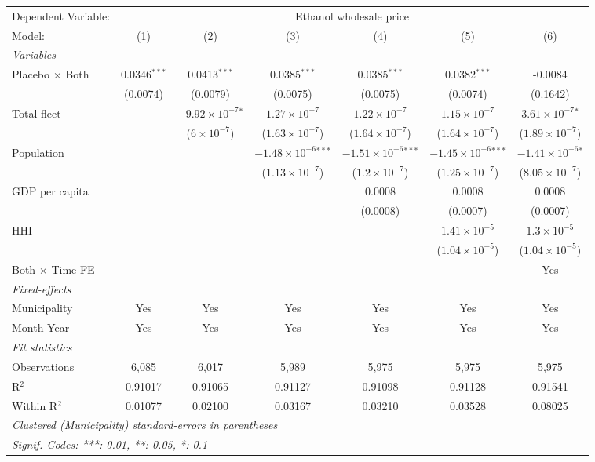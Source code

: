 \documentclass[
]{article}
\begin{document}
\begin{tabular}{lcccccc}
\tabularnewline\midrule\midrule
Dependent Variable:&\multicolumn{6}{c}{Ethanol wholesale price}\\
Model:&(1) & (2) & (3) & (4) & (5) & (6)\\
\midrule \emph{Variables}&   &   &   &   &   &  \\
Placebo $\times $ Both & 0.0346$^{***}$ & 0.0413$^{***}$ & 0.0385$^{***}$ & 0.0385$^{***}$ & 0.0382$^{***}$ & -0.0084\\
  &(0.0074) & (0.0079) & (0.0075) & (0.0075) & (0.0074) & (0.1642)\\
Total fleet &    & $-9.92\times 10^{-7}$$^{*}$ & $1.27\times 10^{-7}$ & $1.22\times 10^{-7}$ & $1.15\times 10^{-7}$ & $3.61\times 10^{-7}$$^{*}$\\
  &   & ($6\times 10^{-7}$) & ($1.63\times 10^{-7}$) & ($1.64\times 10^{-7}$) & ($1.64\times 10^{-7}$) & ($1.89\times 10^{-7}$)\\
Population &    &    & $-1.48\times 10^{-6}$$^{***}$ & $-1.51\times 10^{-6}$$^{***}$ & $-1.45\times 10^{-6}$$^{***}$ & $-1.41\times 10^{-6}$$^{*}$\\
  &   &    & ($1.13\times 10^{-7}$) & ($1.2\times 10^{-7}$) & ($1.25\times 10^{-7}$) & ($8.05\times 10^{-7}$)\\
GDP per capita &    &    &    & 0.0008 & 0.0008 & 0.0008\\
  &   &    &    & (0.0008) & (0.0007) & (0.0007)\\
HHI &    &    &    &    & $1.41\times 10^{-5}$ & $1.3\times 10^{-5}$\\
  &   &    &    &    & ($1.04\times 10^{-5}$) & ($1.04\times 10^{-5}$)\\
Both $\times$ Time FE &  &  &  &  &  & Yes\\
\midrule \emph{Fixed-effects}&   &   &   &   &   &  \\
Municipality & Yes & Yes & Yes & Yes & Yes & Yes\\
Month-Year & Yes & Yes & Yes & Yes & Yes & Yes\\
\midrule \emph{Fit statistics}&  & & & & & \\
Observations & 6,085&6,017&5,989&5,975&5,975&5,975\\
R$^2$ & 0.91017&0.91065&0.91127&0.91098&0.91128&0.91541\\
Within R$^2$ & 0.01077&0.02100&0.03167&0.03210&0.03528&0.08025\\
\midrule\midrule\multicolumn{7}{l}{\emph{Clustered (Municipality) standard-errors in parentheses}}\\
\multicolumn{7}{l}{\emph{Signif. Codes: ***: 0.01, **: 0.05, *: 0.1}}\\
\end{tabular}
\end{document}
